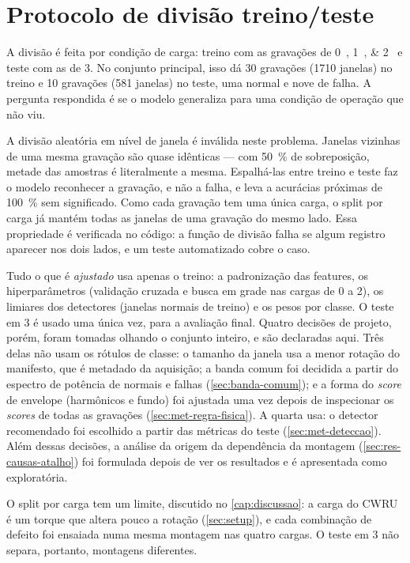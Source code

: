 \section{Protocolo de divisão treino/teste}
\label{sec:split}

A divisão é feita por condição de carga: treino com as gravações de
\SIlist{0;1;2}{\hp} e teste com as de \SI{3}{\hp}. No conjunto principal, isso dá
30 gravações (\num{1710} janelas) no treino e 10 gravações (581 janelas) no
teste, uma normal e nove de falha. A pergunta respondida é se o modelo
generaliza para uma condição de operação que não viu.

A divisão aleatória em nível de janela é inválida neste problema. Janelas
vizinhas de uma mesma gravação são quase idênticas --- com \SI{50}{\percent} de
sobreposição, metade das amostras é literalmente a mesma. Espalhá-las entre
treino e teste faz o modelo reconhecer a gravação, e não a falha, e leva a
acurácias próximas de \SI{100}{\percent} sem significado. Como cada gravação tem
uma única carga, o split por carga já mantém todas as janelas de uma gravação do
mesmo lado. Essa propriedade é verificada no código: a função de divisão falha se
algum registro aparecer nos dois lados, e um teste automatizado cobre o caso.

Tudo o que é \emph{ajustado} usa apenas o treino: a padronização das features, os
hiperparâmetros (validação cruzada e busca em grade nas cargas de 0 a
\SI{2}{\hp}), os limiares dos detectores (janelas normais de treino) e os pesos
por classe. O teste em \SI{3}{\hp} é usado uma única vez, para a avaliação final.
Quatro decisões de projeto, porém, foram tomadas olhando o conjunto inteiro, e
são declaradas aqui. Três delas não usam os rótulos de classe: o tamanho da janela usa a menor
rotação do manifesto, que é metadado da aquisição; a banda comum foi decidida a
partir do espectro de potência de normais e falhas (\autoref{sec:banda-comum}); e
a forma do \emph{score} de envelope (harmônicos e fundo) foi ajustada uma vez depois
de inspecionar os \emph{scores} de todas as gravações
(\autoref{sec:met-regra-fisica}). A quarta usa: o detector recomendado foi
escolhido a partir das métricas do teste (\autoref{sec:met-deteccao}). Além
dessas decisões, a análise da origem da dependência da montagem
(\autoref{sec:res-causas-atalho}) foi formulada depois de ver os resultados e é
apresentada como exploratória.

O split por carga tem um limite, discutido no \autoref{cap:discussao}: a carga do
CWRU é um torque que altera pouco a rotação (\autoref{sec:setup}), e cada
combinação de defeito foi ensaiada numa mesma montagem nas quatro cargas. O
teste em \SI{3}{\hp} não separa, portanto, montagens diferentes.


